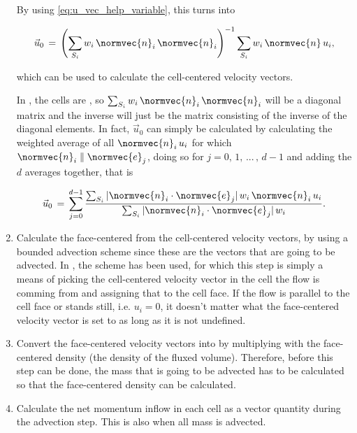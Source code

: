 \begin{enumerate}
    By using \eqref{eq:u_vec_help_variable}, this turns into
    
    \begin{equation}
    \vec{u}_0 \,=\, \left(\sum_{S_i}w_i\,\normvec{n}_i\,\normvec{n}_i\right)^{-1}\sum_{S_i}w_i\,\normvec{n}\,u_i,
    \end{equation}
    
    which can be used to calculate the cell-centered velocity vectors.
    
    In \thisprojectwork, the cells are , so $\sum_{S_i}w_i\,\normvec{n}_i\,\normvec{n}_i$ will be a diagonal matrix and the inverse will just be the matrix consisting of the inverse of the diagonal elements. In fact, $\vec{u}_0$ can simply be calculated by calculating the weighted average of all $\normvec{n}_i\,u_i$ for which $\normvec{n}_i\parallel \normvec{e}_j$, doing so for $j = 0,\, 1,\,...\,,\,d-1$ and adding the $d$ averages together, that is
    
    \begin{equation}
    \vec{u}_0 \,=\, \sum_{j=0}^{d-1} \frac{\sum_{S_i}|\normvec{n}_i\cdot\normvec{e}_j|\,w_i\,\normvec{n}_i\,u_i}{\sum_{S_i}|\normvec{n}_i\cdot\normvec{e}_j|\,w_i}.
    \end{equation}
    
    \item Calculate the face-centered  from the cell-centered velocity vectors, by using a bounded advection scheme since these are the vectors that are going to be advected. In \thisprojectwork, the \UPWIND scheme has been used, for which this step is simply a means of picking the cell-centered velocity vector in the cell the flow is comming from and assigning that to the cell face. If the flow is parallel to the cell face or stands still, i.e. $u_i = 0$, it doesn't matter what the face-centered velocity vector is set to as long as it is not undefined.
    
    \item Convert the face-centered velocity vectors into  by multiplying with the face-centered density (the density of the fluxed volume). Therefore, before this step can be done, the mass that is going to be advected has to be calculated so that the face-centered density can be calculated.
    
    \item Calculate the net momentum inflow in each cell as a vector quantity during the advection step. This is also when all mass is advected.
    

\end{enumerate}
